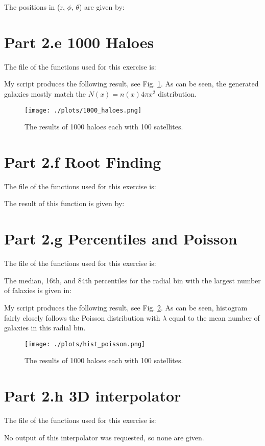 The positions in (r, $\phi$, $\theta$) are given by:



\section{Part 2.e 1000 Haloes}

The file of the functions used for this exercise is:



My script produces the following result, see Fig. \ref{fig:1000_haloes}. As can be seen, the generated galaxies mostly match
the $N(x) = n(x)4\pi x^2$ distribution.

\begin{figure}[h!]
  \centering
  \texttt{[image: ./plots/1000\_haloes.png]}
  \caption{The results of 1000 haloes each with 100 satellites. }
  \label{fig:1000_haloes}
\end{figure}

\section{Part 2.f Root Finding}

The file of the functions used for this exercise is:



The result of this function is given by:



\section{Part 2.g Percentiles and Poisson}

The file of the functions used for this exercise is:



The median, 16th, and 84th percentiles for the radial bin with the largest number of falaxies is given in:



My script produces the following result, see Fig. \ref{fig:hist_poisson}. As can be seen, histogram fairly closely follows
the Poisson distribution with $\lambda$ equal to the mean number of galaxies in this radial bin.

\begin{figure}[h!]
  \centering
  \texttt{[image: ./plots/hist\_poisson.png]}
  \caption{The results of 1000 haloes each with 100 satellites. }
  \label{fig:hist_poisson}
\end{figure}

\section{Part 2.h 3D interpolator}

The file of the functions used for this exercise is:



No output of this interpolator was requested, so none are given.


